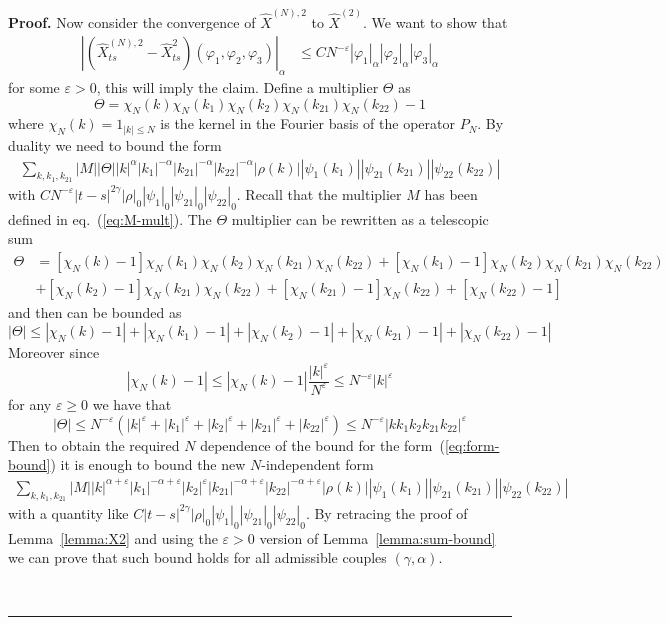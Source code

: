 \documentclass[a4paper,12pt,reqno]{article}
\newcommand{\eps}{\varepsilon}
\newenvironment{proof}[1][Proof]{\textbf{#1.} }{\ \rule{0.5em}{0.5em}}
\begin{document}
\begin{proof}
Now consider the convergence of $\hat X^{(N),2}$ to $\hat X^{(2)}$. We want to show that
\begin{equation}
\label{eq:gal-X2-1}
  \begin{split}
 | (\hat X^{(N),2}_{ts}-\hat X^2_{ts})(\varphi_1,\varphi_2,\varphi_3)|_{\alpha} & \le C N^{-\eps} |\varphi_1|_{\alpha} |\varphi_2|_{\alpha} |\varphi_3|_{\alpha}
  \end{split}
\end{equation}
for some $\eps > 0$, this will imply the claim. 
Define a multiplier $\Theta$ as
$$
\Theta =  \chi_N(k) \chi_N(k_1) \chi_N(k_2) \chi_N(k_{21}) \chi_N(k_{22})-1  
$$
where $\chi_N(k) = 1_{|k|\le N}$ is the kernel in the Fourier basis of the  operator $P_N$.
By duality we need to bound the form
\begin{equation}
\label{eq:form-bound}
  \begin{split}
\sum_{k,k_1,k_{21}} |M| |\Theta| |k|^{\alpha} |k_1|^{-\alpha}
|k_{21}|^{-\alpha} |k_{22}|^{-\alpha} |\rho(k)| |\psi_1(k_1)|   |\psi_{21}(k_{21})|  |\psi_{22}(k_{22})|  
  \end{split}
\end{equation}
with $C N^{-\eps} |t-s|^{2\gamma} |\rho|_0 |\psi_1|_0 |\psi_{21}|_0 |\psi_{22}|_0$. Recall that the multiplier $M$ has been defined in eq.~(\ref{eq:M-mult}). 
The $\Theta$ multiplier can be rewritten as a telescopic sum
\begin{equation*}
  \begin{split}
\Theta & = [\chi_N(k)-1] \chi_N(k_1) \chi_N(k_2) \chi_N(k_{21}) \chi_N(k_{22}) +
[\chi_N(k_1)-1] \chi_N(k_2) \chi_N(k_{21}) \chi_N(k_{22})
\\ & +  [\chi_N(k_2)-1] \chi_N(k_{21}) \chi_N(k_{22}) +  [\chi_N(k_{21})-1] \chi_N(k_{22}) + [\chi_N(k_{22})-1]    
  \end{split}
\end{equation*}
and then can be bounded as
$$
|\Theta| \le |\chi_N(k)-1|+|\chi_N(k_1)-1|+|\chi_N(k_2)-1|+|\chi_N(k_{21})-1|+|\chi_N(k_{22})-1|
$$
Moreover since
$$
|\chi_N(k)-1| \le |\chi_N(k)-1| \frac{|k|^\eps}{N^\eps} \le N^{-\eps} |k|^\eps 
$$
for any $\eps \ge 0$ we have that
$$
|\Theta| \le N^{-\eps}(|k|^\eps+|k_{1}|^\eps+|k_{2}|^\eps+|k_{21}|^\eps+|k_{22}|^\eps)
\le N^{-\eps} |k k_1 k_2 k_{21} k_{22}|^\eps
$$
Then to obtain the required $N$ dependence of the bound for the form~(\ref{eq:form-bound}) it is enough to bound the new $N$-independent  form
\begin{equation}
\label{eq:form-bound-new}
  \begin{split}
\sum_{k,k_1,k_{21}} |M|  |k|^{\alpha+\eps} |k_1|^{-\alpha+\eps} |k_2|^{\eps}
|k_{21}|^{-\alpha+\eps} |k_{22}|^{-\alpha+\eps} |\rho(k)| |\psi_1(k_1)|   |\psi_{21}(k_{21})|  |\psi_{22}(k_{22})|  
  \end{split}
\end{equation}
with a quantity like $C  |t-s|^{2\gamma} |\rho|_0 |\psi_1|_0 |\psi_{21}|_0 |\psi_{22}|_0$. By retracing the proof of Lemma~\ref{lemma:X2} and using the $\eps>0$ version of Lemma~\ref{lemma:sum-bound} we can prove that such bound holds for all admissible couples $(\gamma,\alpha)$. 


\end{proof}
\end{document}
